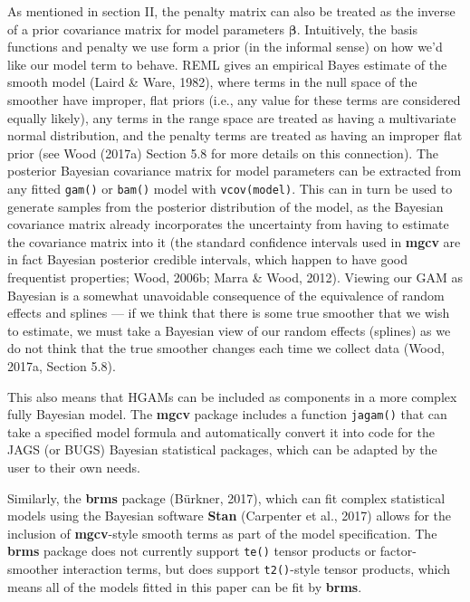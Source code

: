 \documentclass[12pt]{article}
\begin{document}
As mentioned in section II, the penalty matrix can also be treated as
the inverse of a prior covariance matrix for model parameters
\(\boldsymbol{\beta}\). Intuitively, the basis functions and penalty we
use form a prior (in the informal sense) on how we'd like our model term
to behave. REML gives an empirical Bayes estimate of the smooth model
(Laird \& Ware, 1982), where terms in the null space of the smoother
have improper, flat priors (i.e., any value for these terms are
considered equally likely), any terms in the range space are treated as
having a multivariate normal distribution, and the penalty terms are
treated as having an improper flat prior (see Wood (2017a) Section 5.8
for more details on this connection). The posterior Bayesian covariance
matrix for model parameters can be extracted from any fitted
\texttt{gam()} or \texttt{bam()} model with \texttt{vcov(model)}. This
can in turn be used to generate samples from the posterior distribution
of the model, as the Bayesian covariance matrix already incorporates the
uncertainty from having to estimate the covariance matrix into it (the
standard confidence intervals used in \textbf{mgcv} are in fact Bayesian
posterior credible intervals, which happen to have good frequentist
properties; Wood, 2006b; Marra \& Wood, 2012). Viewing our GAM as
Bayesian is a somewhat unavoidable consequence of the equivalence of
random effects and splines --- if we think that there is some true
smoother that we wish to estimate, we must take a Bayesian view of our
random effects (splines) as we do not think that the true smoother
changes each time we collect data (Wood, 2017a, Section 5.8).

This also means that HGAMs can be included as components in a more
complex fully Bayesian model. The \textbf{mgcv} package includes a
function \texttt{jagam()} that can take a specified model formula and
automatically convert it into code for the JAGS (or BUGS) Bayesian
statistical packages, which can be adapted by the user to their own
needs.

Similarly, the \textbf{brms} package (Bürkner, 2017), which can fit
complex statistical models using the Bayesian software \textbf{Stan}
(Carpenter et al., 2017) allows for the inclusion of \textbf{mgcv}-style
smooth terms as part of the model specification. The \textbf{brms}
package does not currently support \texttt{te()} tensor products or
factor-smoother interaction terms, but does support \texttt{t2()}-style
tensor products, which means all of the models fitted in this paper can
be fit by \textbf{brms}.
\end{document}
